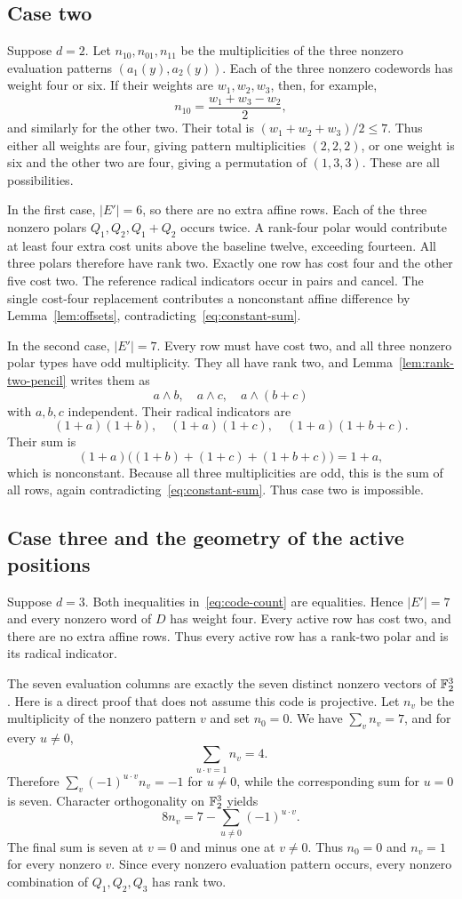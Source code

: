 \subsection{Case two}
Suppose $d=2$. Let $n_{10},n_{01},n_{11}$ be the multiplicities of the three nonzero evaluation patterns $(a_1(y),a_2(y))$. Each of the three nonzero codewords has weight four or six. If their weights are $w_1,w_2,w_3$, then, for example,
\[
n_{10}=\frac{w_1+w_3-w_2}{2},
\]
and similarly for the other two. Their total is $(w_1+w_2+w_3)/2\le7$. Thus either all weights are four, giving pattern multiplicities $(2,2,2)$, or one weight is six and the other two are four, giving a permutation of $(1,3,3)$. These are all possibilities.

In the first case, $|E'|=6$, so there are no extra affine rows. Each of the three nonzero polars $Q_1,Q_2,Q_1+Q_2$ occurs twice. A rank-four polar would contribute at least four extra cost units above the baseline twelve, exceeding fourteen. All three polars therefore have rank two. Exactly one row has cost four and the other five cost two. The reference radical indicators occur in pairs and cancel. The single cost-four replacement contributes a nonconstant affine difference by Lemma~\ref{lem:offsets}, contradicting~\eqref{eq:constant-sum}.

In the second case, $|E'|=7$. Every row must have cost two, and all three nonzero polar types have odd multiplicity. They all have rank two, and Lemma~\ref{lem:rank-two-pencil} writes them as
\[
a\wedge b,\quad a\wedge c,\quad a\wedge(b+c)
\]
with $a,b,c$ independent. Their radical indicators are
\[
(1+a)(1+b),\quad(1+a)(1+c),\quad(1+a)(1+b+c).
\]
Their sum is
\[
(1+a)\bigl((1+b)+(1+c)+(1+b+c)\bigr)=1+a,
\]
which is nonconstant. Because all three multiplicities are odd, this is the sum of all rows, again contradicting~\eqref{eq:constant-sum}. Thus case two is impossible.

\subsection{Case three and the geometry of the active positions}
Suppose $d=3$. Both inequalities in~\eqref{eq:code-count} are equalities. Hence $|E'|=7$ and every nonzero word of $D$ has weight four. Every active row has cost two, and there are no extra affine rows. Thus every active row has a rank-two polar and is its radical indicator.

The seven evaluation columns are exactly the seven distinct nonzero vectors of $\mathbb F_2^3$. Here is a direct proof that does not assume this code is projective. Let $n_v$ be the multiplicity of the nonzero pattern $v$ and set $n_0=0$. We have $\sum_vn_v=7$, and for every $u\ne0$,
\[
\sum_{u\cdot v=1}n_v=4.
\]
Therefore $\sum_v(-1)^{u\cdot v}n_v=-1$ for $u\ne0$, while the corresponding sum for $u=0$ is seven. Character orthogonality on $\mathbb F_2^3$ yields
\[
8n_v=7-\sum_{u\ne0}(-1)^{u\cdot v}.
\]
The final sum is seven at $v=0$ and minus one at $v\ne0$. Thus $n_0=0$ and $n_v=1$ for every nonzero $v$. Since every nonzero evaluation pattern occurs, every nonzero combination of $Q_1,Q_2,Q_3$ has rank two.

